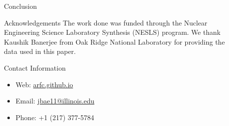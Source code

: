 \documentclass[final]{beamer}
\newlength{\sepwid}
\newlength{\onecolwid}
\newlength{\threecolwid}
\begin{document}
\begin{frame}[t]
\begin{columns}[t,totalwidth=\threecolwid]
\begin{column}{\onecolwid}
\begin{block}{Conclusion}
\begin{itemize}
\end{itemize}
\end{block}



\begin{block}{Acknowledgements}
The work done was funded through the Nuclear Engineering Science
Laboratory Synthesis (NESLS) program. We thank Kaushik Banerjee
from Oak Ridge National Laboratory for providing the data used
in this paper. 

\end{block}





\begin{alertblock}{Contact Information}
\begin{itemize}
    
    \item Web: \href{arfc.github.io}{arfc.github.io}
    \item Email: \href{mailto:jbae11@illinois.edu}{jbae11@illinois.edu}
    \item Phone: +1 (217) 377-5784
\end{itemize}

\end{alertblock}


\end{column} %

\begin{column}{\sepwid}\end{column} %

\begin{column}{\onecolwid} %



\end{column}
\end{columns}
\end{frame}
\end{document}
